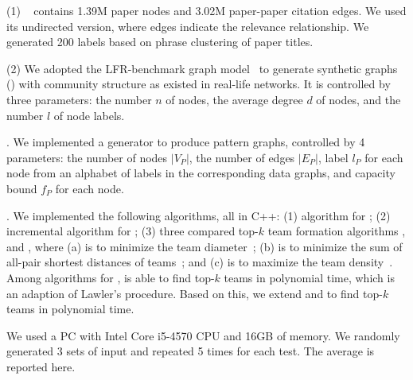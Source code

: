 \ni (1) {\em \citationd}~\cite{citationWeb} contains 1.39M paper nodes and 3.02M paper-paper citation edges.
We used its undirected version, where edges indicate the relevance relationship. We generated 200 labels based on phrase clustering of paper titles.


\ni (2) We adopted the LFR-benchmark graph model~\cite{AndreaSF08} to generate synthetic graphs (\synthetic) with community structure as existed in real-life networks. It is controlled by three parameters: the number $n$ of nodes, the average degree $d$ of nodes, and the number $l$ of node labels.

.
We implemented a generator to produce pattern graphs, controlled by 4 parameters:
the number of nodes $|V_P|$, the number of edges $|E_P|$, label $l_{P}$ for each node from
an alphabet of labels in the corresponding data graphs,
and capacity bound $f_{P}$ for each node.

. We implemented the following algorithms, all in C++:
(1) algorithm \optgrouprec for \teamF; (2) incremental algorithm \inc for \dynteamF;
(3) three compared top-$k$ team formation algorithms \mindia, \minsumdis and \denalk, where
(a) \mindia is to minimize the team diameter~\cite{Lappas09}; 
(b) \minsumdis is to minimize the sum of all-pair shortest distances of teams~\cite{Kargar11}; and
(c) \denalk is to maximize the team density~\cite{GajewarS12}. 
Among algorithms for \teamF, \minsumdis is able to find top-$k$ teams in polynomial time, which is an adaption of Lawler's procedure.
Based on this, we extend \mindia and \denalk to find top-$k$ teams in polynomial time.

We used a PC with Intel Core i5-4570 CPU and 16GB of memory. We randomly generated 3 sets of input and repeated 5 times for each test. The average is reported here.


